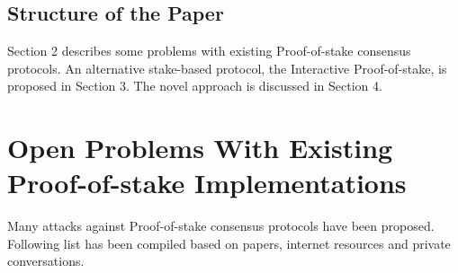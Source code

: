 \documentclass[preprint,review,3p,times,twocolumn]{elsarticle}
\begin{document}
\subsection{Structure of the Paper}

Section 2 describes some problems with existing Proof-of-stake consensus protocols. An alternative stake-based protocol, the Interactive Proof-of-stake, is proposed in Section 3. The novel approach is discussed in Section 4.

\section{Open Problems With Existing Proof-of-stake Implementations}
\label{s_problems}

Many attacks against Proof-of-stake consensus protocols have been proposed. Following list has been compiled based on papers\cite{Bentov2014,Bentov2013}, internet resources\cite{Buterin,Buterina,Poelstra} and private conversations.
\end{document}
